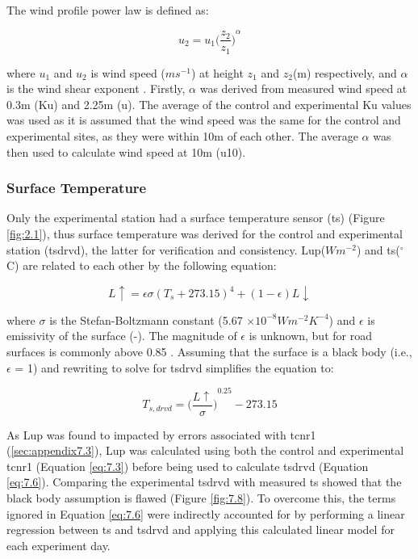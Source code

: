 \documentclass[final,3p,times,authoryear]{elsarticle}
\begin{document}
The wind profile power law is defined as:

\begin{equation}
u_{2} = u_{1}  { \bigg( \frac{ z_{2} }{ z_{1} } \bigg) } ^{\alpha}
\label{eq:7.4}
\end{equation}

where $u_{1}$ and $u_{2}$ is wind speed ($ms^{-1}$) at height $z_{1}$ and $z_{2}$(m) respectively, and $\alpha$ is the wind shear exponent \citep{Manwell2010}. Firstly, $\alpha$ was derived from measured wind speed at 0.3m (\gls{Ku}) and 2.25m (\gls{u}). The average of the control and experimental \gls{Ku} values was used as it is assumed that the wind speed was the same for the control and experimental sites, as they were within 10m of each other. The average $\alpha$ was then used to calculate wind speed at 10m (\gls{u10}). 

\subsubsection{Surface Temperature}\label{sec:appendix7.4.2}

Only the experimental station had a surface temperature sensor (\gls{ts}) (Figure \ref{fig:2.1}), thus surface temperature was derived for the control and experimental station (\gls{tsdrvd}), the latter for verification and consistency. \gls{Lup}($Wm^{-2}$) and \gls{ts}($^{\circ}$C) are related to each other by the following equation:

\begin{equation}
L\uparrow = \epsilon \sigma (T_{s} + 273.15)^{4} + (1 - \epsilon) L\downarrow
\label{eq:7.5}
\end{equation}

where $\sigma$ is the Stefan-Boltzmann constant (5.67 $\times 10^{-8} Wm^{-2}K^{-4}$) and $\epsilon$ is emissivity of the surface (-). The magnitude of $\epsilon$ is unknown, but for road surfaces is commonly above 0.85 \citep{Oke2017}. Assuming that the surface is a black body (i.e., $\epsilon$ = 1) and rewriting to solve for \gls{tsdrvd} simplifies the equation to:

\begin{equation}
T_{s,drvd} =  { \bigg( \frac{  L\uparrow } {\sigma}   \bigg) }^{0.25} - 273.15
\label{eq:7.6}
\end{equation}

As \gls{Lup} was found to impacted by errors associated with \gls{tcnr1} (\ref{sec:appendix7.3}), \gls{Lup} was calculated using both the control and experimental \gls{tcnr1} (Equation \ref{eq:7.3}) before being used to calculate \gls{tsdrvd} (Equation \ref{eq:7.6}). Comparing the experimental \gls{tsdrvd} with measured \gls{ts} showed that the black body assumption is flawed (Figure \ref{fig:7.8}). To overcome this, the terms ignored in Equation \ref{eq:7.6} were indirectly accounted for by performing a linear regression between \gls{ts} and \gls{tsdrvd} and applying this calculated linear model for each experiment day.
\end{document}
